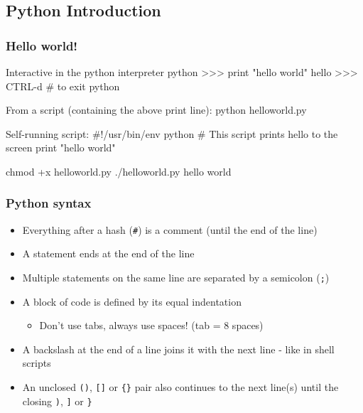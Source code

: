 \documentclass[hyperref={colorlinks=true}]{beamer}
\begin{document}
\subsection[Python Introduction]{Python Introduction}

\begin{frame}[fragile]
  \frametitle{Hello world!}

  \begin{ucpythonblock}{Interactive in the python interpreter}
python
>>> print "hello world"
hello
>>> CTRL-d  # to exit python
  \end{ucpythonblock}
  
  \begin{ucpythonblock}{From a script (containing the above print line):}
python helloworld.py
  \end{ucpythonblock}
  
  \begin{ucpythonblock}{Self-running script:}
#!/usr/bin/env python
# This script prints hello to the screen
print "hello world"
  \end{ucpythonblock}
  
  \begin{ucpythonblock}{}
chmod +x helloworld.py
./helloworld.py
hello world
  \end{ucpythonblock}
  
\end{frame}


\begin{frame}[fragile]
  \frametitle{Python syntax}

  \begin{itemize}
    \item Everything after a hash (\texttt{\#}) is a comment (until the end of the line)
    \item A statement ends at the end of the line
    \item Multiple statements on the same line are separated by a semicolon (\texttt{;})
    \item A block of code is defined by its equal indentation
    \begin{itemize}
       \item Don't use tabs, always use spaces! (tab = 8 spaces)
    \end{itemize}
    \item A backslash at the end of a line joins it with the next line - like in shell scripts
    \item An unclosed \texttt{()}, \texttt{[]} or \texttt{\{\}} pair also continues to the next line(s) until the closing \texttt{)}, \texttt{]} or \texttt{\}}
  \end{itemize}
  
\end{frame}
\end{document}
